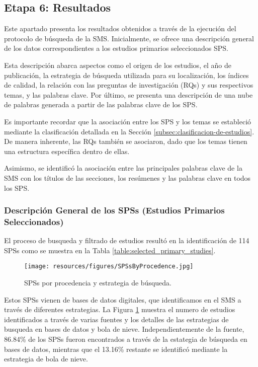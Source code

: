 \subsection{Etapa 6: Resultados}
Este apartado presenta los resultados obtenidos a través de la ejecución del protocolo de búsqueda de la SMS. Inicialmente, se ofrece una descripción general de los datos correspondientes a los estudios primarios seleccionados SPS.

Esta descripción abarca aspectos como el origen de los estudios, el año de publicación, la estrategia de búsqueda utilizada para su localización, los índices de calidad, la relación con las preguntas de investigación (RQs) y sus respectivos temas, y las palabras clave. Por último, se presenta una descripción de una nube de palabras generada a partir de las palabras clave de los SPS.

Es importante recordar que la asociación entre los SPS y los temas se estableció mediante la clasificación detallada en la Sección \ref{subsec:clasificacion-de-estudios}. De manera inherente, las RQs también se asociaron, dado que los temas tienen una estructura específica dentro de ellas.

Asimismo, se identificó la asociación entre las principales palabras clave de la SMS con los títulos de las secciones, los resúmenes y las palabras clave en todos los SPS.

\subsubsection{Descripción General de los SPSs (Estudios Primarios Seleccionados)}
El proceso de busqueda y filtrado de estudios resultó en la identificación de 114 SPSs como se muestra en la Tabla \ref{table:selected_primary_studies}.

\begin{figure}[htbp]
	\centering
	\vspace{10pt}
	\texttt{[image: resources/figures/SPSsByProcedence.jpg]}
	\vspace{6pt}
	\caption{SPSs por procedencia y estrategia de búsqueda.}
	\label{fig:SPSsByProcedence}
\end{figure}

Estos SPSs vienen de bases de datos digitales, que identificamos en el SMS a través de diferentes estrategias. La Figura \ref{fig:SPSsByProcedence} muestra el numero de estudios identificados a través de varias fuentes y los detalles de las estrategias de busqueda en bases de datos y bola de nieve. Independientemente de la fuente, 86.84\% de los SPSs fueron encontrados a través de la estategia de búsqueda en bases de datos, mientras que el 13.16\% restante se identificó mediante la estrategia de bola de nieve.

